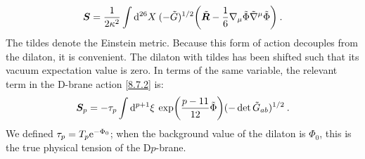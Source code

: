 \begin{equation}
	\bm{S}=\frac{1}{2 \kappa^{2}} \int \mathrm{d}^{26} X \: (-\tilde{G})^{1/2} 
	\biggl(\tilde{\bm{R}}-\frac{1}{6} \nabla_{\mu} \tilde{\Phi} \tilde{\nabla}^{\mu} \tilde{\Phi}\biggr) \:. \label{8.7.19}
\end{equation}
The tildes denote the Einstein metric.
Because this form of action decouples from the dilaton, it is convenient. The dilaton with tildes has been shifted such that its vacuum expectation value is zero. 
In terms of the same variable, the relevant term in the D-brane action \eqref{8.7.2} is:
\begin{equation}
	\bm{S}_{p} = -\tau_{p} \int \mathrm{d}^{p+1} \xi \: \exp \biggl(\frac{p-11}{12} \tilde{\Phi}\biggr)
	(-\operatorname{det} \tilde{G}_{ab})^{1/2} \:. \label{8.7.20}
\end{equation}
We defined $\tau_{p}=T_{p} \mathrm{e}^{-\Phi_{0}}$; when the background value of the dilaton is $\Phi_{0}$, this is the true physical tension of the D$p$-brane.

